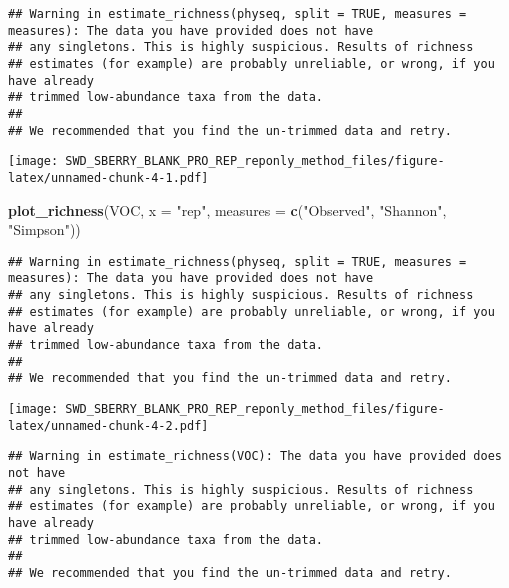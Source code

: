 \documentclass[]{article}
\newenvironment{Shaded}{\begin{snugshade}}{\end{snugshade}}
\newcommand{\KeywordTok}[1]{\textcolor[rgb]{0.13,0.29,0.53}{\textbf{#1}}}
\newcommand{\DataTypeTok}[1]{\textcolor[rgb]{0.13,0.29,0.53}{#1}}
\newcommand{\StringTok}[1]{\textcolor[rgb]{0.31,0.60,0.02}{#1}}
\newcommand{\OperatorTok}[1]{\textcolor[rgb]{0.81,0.36,0.00}{\textbf{#1}}}
\newcommand{\NormalTok}[1]{#1}
\begin{document}
\begin{verbatim}
## Warning in estimate_richness(physeq, split = TRUE, measures = measures): The data you have provided does not have
## any singletons. This is highly suspicious. Results of richness
## estimates (for example) are probably unreliable, or wrong, if you have already
## trimmed low-abundance taxa from the data.
## 
## We recommended that you find the un-trimmed data and retry.
\end{verbatim}

\texttt{[image: SWD\_SBERRY\_BLANK\_PRO\_REP\_reponly\_method\_files/figure-latex/unnamed-chunk-4-1.pdf]}

\begin{Shaded}
\begin{Highlighting}[]
\KeywordTok{plot_richness}\NormalTok{(VOC, }\DataTypeTok{x =} \StringTok{"rep"}\NormalTok{, }\DataTypeTok{measures =} \KeywordTok{c}\NormalTok{(}\StringTok{"Observed"}\NormalTok{, }\StringTok{"Shannon"}\NormalTok{, }\StringTok{"Simpson"}\NormalTok{))}
\end{Highlighting}
\end{Shaded}

\begin{verbatim}
## Warning in estimate_richness(physeq, split = TRUE, measures = measures): The data you have provided does not have
## any singletons. This is highly suspicious. Results of richness
## estimates (for example) are probably unreliable, or wrong, if you have already
## trimmed low-abundance taxa from the data.
## 
## We recommended that you find the un-trimmed data and retry.
\end{verbatim}

\texttt{[image: SWD\_SBERRY\_BLANK\_PRO\_REP\_reponly\_method\_files/figure-latex/unnamed-chunk-4-2.pdf]}

\begin{Shaded}
\end{Shaded}

\begin{verbatim}
## Warning in estimate_richness(VOC): The data you have provided does not have
## any singletons. This is highly suspicious. Results of richness
## estimates (for example) are probably unreliable, or wrong, if you have already
## trimmed low-abundance taxa from the data.
## 
## We recommended that you find the un-trimmed data and retry.
\end{verbatim}
\end{document}
